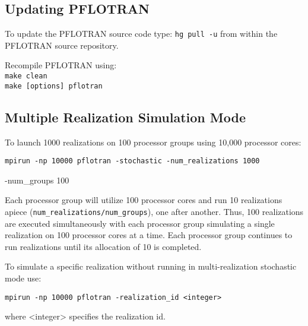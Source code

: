 \subsection*{Updating PFLOTRAN}

To update the PFLOTRAN source code
type: {\tt hg pull -u} from within the PFLOTRAN source repository.

\noindent
Recompile PFLOTRAN using:\\
\indent
{\tt make clean}\\
\indent
{\tt make [options] pflotran}

\subsection*{Multiple Realization Simulation Mode}

To launch 1000 realizations on 100 processor groups using 10,000 processor cores:

\noindent
{\tt mpirun -np 10000 pflotran -stochastic -num\_realizations 1000 

-num\_groups 100}

Each processor group will utilize 100 processor cores and run 10 realizations apiece \linebreak ({\tt num\_realizations/num\_groups}), one after another. Thus, 100 realizations are executed simultaneously with each processor group simulating a single realization on 100 processor cores at a time. Each processor group continues to run realizations until its allocation of 10 is completed.

\noindent
To simulate a specific realization without running in multi-realization stochastic mode use:

{\tt mpirun -np 10000 pflotran -realization\_id <integer>}

\noindent
where <integer> specifies the realization id.

